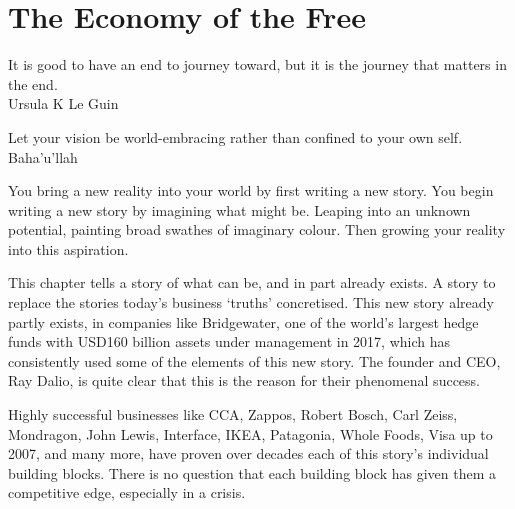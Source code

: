 ﻿\chapter{The Economy of the Free}
\label{chapter:economy-of-the-free}


\begin{chapterquotation}
It is good to have an end to journey toward, but it is the journey that matters in the end.\\
\raggedleft\textemdash Ursula K Le Guin


\centering
Let your vision be world-embracing rather than confined to your own self.\\
\raggedleft\textemdash Baha’u’llah
\end{chapterquotation}




You bring a new reality into your world by first writing a new story. You begin writing a new story by imagining what might be. Leaping into an unknown potential, painting broad swathes of imaginary colour. Then growing your reality into this aspiration. 


This chapter tells a story of what can be, and in part already exists. A story to replace the stories today’s business ‘truths’ concretised. This new story already partly exists, in companies like Bridgewater\cite{dalio-principles}, one of the world's largest hedge funds with USD160 billion assets under management in 2017, which has consistently used some of the elements of this new story. The founder and CEO, Ray Dalio, is quite clear that this is the reason for their phenomenal success.


Highly successful businesses like CCA, Zappos, Robert Bosch, Carl Zeiss, Mondragon, John Lewis, Interface,  IKEA, Patagonia, Whole Foods, Visa up to 2007, and many more, have proven over decades each of this story’s individual building blocks. There is no question that each building block has given them a competitive edge, especially in a crisis.


